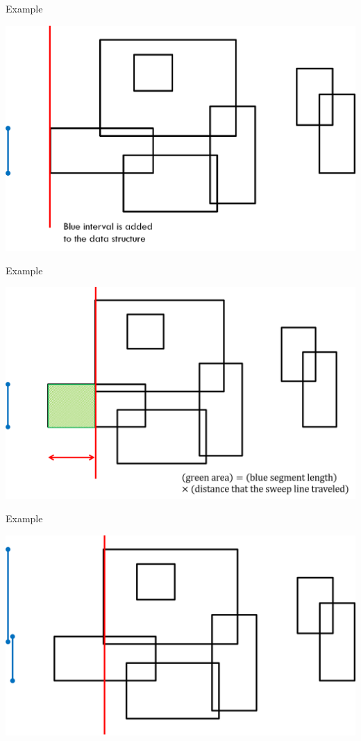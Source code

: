 \documentclass[13pt,onlymath]{beamer}
\begin{document}
\begin{frame}{Example}
\begin{center}
\includegraphics[height=0.6\textheight]{figures/sweep2}
\end{center}
\end{frame}

\begin{frame}{Example}
\begin{center}
\includegraphics[height=0.6\textheight]{figures/sweep3}
\end{center}
\end{frame}

\begin{frame}{Example}
\begin{center}
\includegraphics[height=0.6\textheight]{figures/sweep4}
\end{center}
\end{frame}
\end{document}
